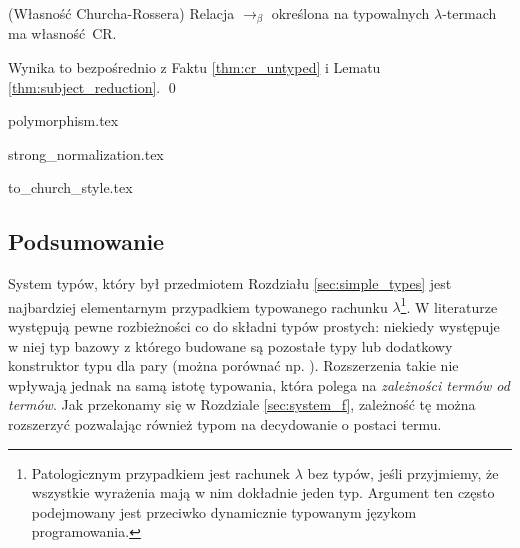 \begin{twierdzenie}(Własność Churcha-Rossera)
  Relacja \(\to_\beta\) określona na typowalnych \(\lambda\)-termach  ma własność CR.
\end{twierdzenie}
\begin{dowod}
  Wynika to bezpośrednio z Faktu \ref{thm:cr_untyped} i Lematu \ref{thm:subject_reduction}. \qed
\end{dowod}

{polymorphism.tex}

{strong_normalization.tex}

{to_church_style.tex}
\subsection{Podsumowanie}
System typów, który był przedmiotem Rozdziału \ref{sec:simple_types} jest najbardziej elementarnym przypadkiem typowanego rachunku \(\lambda\)\footnote{Patologicznym przypadkiem jest rachunek \(\lambda\) bez typów, jeśli przyjmiemy, że wszystkie wyrażenia mają w nim dokładnie jeden typ. Argument ten często podejmowany jest przeciwko dynamicznie typowanym językom programowania.}. W literaturze występują pewne rozbieżności co do składni typów prostych: niekiedy występuje w niej typ bazowy z którego budowane są pozostałe typy lub dodatkowy konstruktor typu dla pary (można porównać np. \cite{Girard:1989:PT:64805,DBLP:journals/corr/abs-0804-3434}). Rozszerzenia takie nie wpływają jednak na samą istotę typowania, która polega na \emph{zależności termów od termów}. Jak przekonamy się w Rozdziale \ref{sec:system_f}, zależność tę można rozszerzyć pozwalając również typom na decydowanie o postaci termu. 
%



